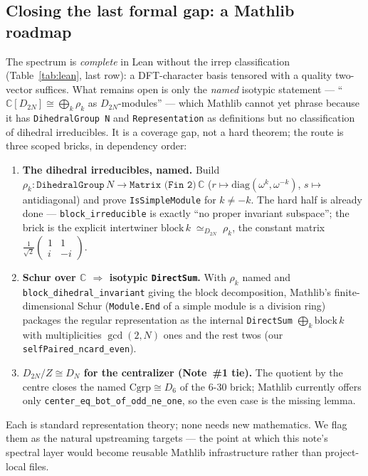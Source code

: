 \documentclass[11pt]{article}
\newcommand{\lean}[1]{\texttt{#1}}
\begin{document}
\subsection*{Closing the last formal gap: a Mathlib roadmap}
The spectrum is \emph{complete} in Lean without the irrep classification (Table~\ref{tab:lean}, last row): a
DFT-character basis tensored with a quality two-vector suffices. What remains open is only the \emph{named}
isotypic statement --- ``$\mathbb{C}[D_{2N}]\cong\bigoplus_k\rho_k$ as $D_{2N}$-modules'' --- which Mathlib
cannot yet phrase because it has \lean{DihedralGroup N} and \lean{Representation} as definitions but no
classification of dihedral irreducibles. It is a coverage gap, not a hard theorem; the route is three scoped
bricks, in dependency order:
\begin{enumerate}\setlength\itemsep{1pt}
  \item \textbf{The dihedral irreducibles, named.} Build $\rho_k:\lean{DihedralGroup}\,N\to\lean{Matrix (Fin
        2)}\,\mathbb{C}$ ($r\mapsto\mathrm{diag}(\omega^{k},\omega^{-k})$, $s\mapsto$ antidiagonal) and prove
        \lean{IsSimpleModule} for $k\neq-k$. The hard half is already done --- \lean{block\_irreducible} is
        exactly ``no proper invariant subspace''; the brick is the explicit intertwiner
        $\mathrm{block}\,k\;\simeq_{D_{2N}}\;\rho_k$, the constant matrix
        $\tfrac1{\sqrt2}\left(\begin{smallmatrix}1&1\\ i&-i\end{smallmatrix}\right)$.
  \item \textbf{Schur over $\mathbb{C}$ $\Rightarrow$ isotypic \lean{DirectSum}.} With $\rho_k$ named and
        \lean{block\_dihedral\_invariant} giving the block decomposition, Mathlib's finite-dimensional Schur
        (\lean{Module.End} of a simple module is a division ring) packages the regular representation as the
        internal \lean{DirectSum} $\bigoplus_k\mathrm{block}\,k$ with multiplicities $\gcd(2,N)$ ones and the
        rest twos (our \lean{selfPaired\_ncard\_even}).
  \item \textbf{$D_{2N}/Z\cong D_{N}$ for the centralizer (Note~\#1 tie).} The quotient by the centre closes
        the named $\mathrm{Cgrp}\cong D_{6}$ of the $6$-$30$ brick; Mathlib currently offers only
        \lean{center\_eq\_bot\_of\_odd\_ne\_one}, so the even case is the missing lemma.
\end{enumerate}
\noindent Each is standard representation theory; none needs new mathematics. We flag them as the natural
upstreaming targets --- the point at which this note's spectral layer would become reusable Mathlib
infrastructure rather than project-local files.
\end{document}

